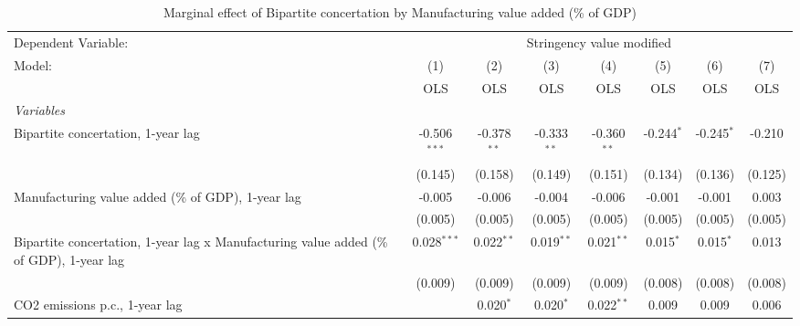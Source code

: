 
\begin{table}[htbp]
   \caption{Marginal effect of Bipartite concertation by Manufacturing value added (\% of GDP)}
   \centering
   \begin{tabular}{lccccccc}
      \toprule
      Dependent Variable: & \multicolumn{7}{c}{Stringency value modified}\\
      Model:                                                                                  & (1)            & (2)           & (3)           & (4)           & (5)          & (6)          & (7)\\  
                                                                                              &  OLS           & OLS           & OLS           & OLS           & OLS          & OLS          & OLS\\  
      \midrule
      \emph{Variables}\\
      Bipartite concertation, 1-year lag                                                      & -0.506$^{***}$ & -0.378$^{**}$ & -0.333$^{**}$ & -0.360$^{**}$ & -0.244$^{*}$ & -0.245$^{*}$ & -0.210\\   
                                                                                              & (0.145)        & (0.158)       & (0.149)       & (0.151)       & (0.134)      & (0.136)      & (0.125)\\   
      Manufacturing value added (\% of GDP), 1-year lag                                       & -0.005         & -0.006        & -0.004        & -0.006        & -0.001       & -0.001       & 0.003\\   
                                                                                              & (0.005)        & (0.005)       & (0.005)       & (0.005)       & (0.005)      & (0.005)      & (0.005)\\   
      Bipartite concertation, 1-year lag x Manufacturing value added (\% of GDP), 1-year lag  & 0.028$^{***}$  & 0.022$^{**}$  & 0.019$^{**}$  & 0.021$^{**}$  & 0.015$^{*}$  & 0.015$^{*}$  & 0.013\\   
                                                                                              & (0.009)        & (0.009)       & (0.009)       & (0.009)       & (0.008)      & (0.008)      & (0.008)\\   
      CO2 emissions p.c., 1-year lag                                                          &                & 0.020$^{*}$   & 0.020$^{*}$   & 0.022$^{**}$  & 0.009        & 0.009        & 0.006\\   

\end{tabular}
\end{table}
